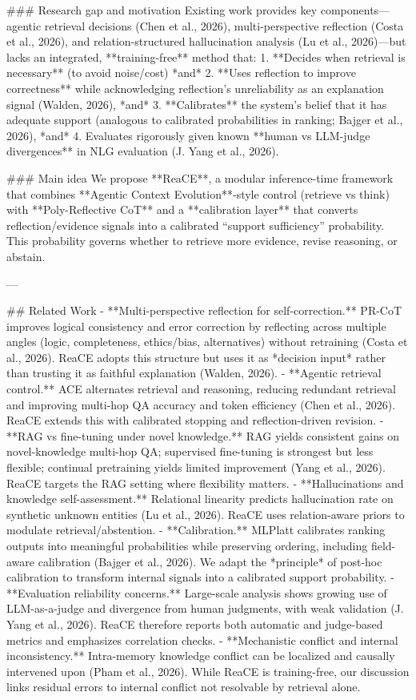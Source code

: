 ### Research gap and motivation  
Existing work provides key components—agentic retrieval decisions (Chen et al., 2026), multi-perspective reflection (Costa et al., 2026), and relation-structured hallucination analysis (Lu et al., 2026)—but lacks an integrated, **training-free** method that:
1. **Decides when retrieval is necessary** (to avoid noise/cost) *and*  
2. **Uses reflection to improve correctness** while acknowledging reflection’s unreliability as an explanation signal (Walden, 2026), *and*  
3. **Calibrates** the system’s belief that it has adequate support (analogous to calibrated probabilities in ranking; Bajger et al., 2026), *and*  
4. Evaluates rigorously given known **human vs LLM-judge divergences** in NLG evaluation (J. Yang et al., 2026).

### Main idea  
We propose **ReaCE**, a modular inference-time framework that combines **Agentic Context Evolution**-style control (retrieve vs think) with **Poly-Reflective CoT** and a **calibration layer** that converts reflection/evidence signals into a calibrated “support sufficiency” probability. This probability governs whether to retrieve more evidence, revise reasoning, or abstain.

---

## Related Work  
- **Multi-perspective reflection for self-correction.** PR-CoT improves logical consistency and error correction by reflecting across multiple angles (logic, completeness, ethics/bias, alternatives) without retraining (Costa et al., 2026). ReaCE adopts this structure but uses it as *decision input* rather than trusting it as faithful explanation (Walden, 2026).  
- **Agentic retrieval control.** ACE alternates retrieval and reasoning, reducing redundant retrieval and improving multi-hop QA accuracy and token efficiency (Chen et al., 2026). ReaCE extends this with calibrated stopping and reflection-driven revision.  
- **RAG vs fine-tuning under novel knowledge.** RAG yields consistent gains on novel-knowledge multi-hop QA; supervised fine-tuning is strongest but less flexible; continual pretraining yields limited improvement (Yang et al., 2026). ReaCE targets the RAG setting where flexibility matters.  
- **Hallucinations and knowledge self-assessment.** Relational linearity predicts hallucination rate on synthetic unknown entities (Lu et al., 2026). ReaCE uses relation-aware priors to modulate retrieval/abstention.  
- **Calibration.** MLPlatt calibrates ranking outputs into meaningful probabilities while preserving ordering, including field-aware calibration (Bajger et al., 2026). We adapt the *principle* of post-hoc calibration to transform internal signals into a calibrated support probability.  
- **Evaluation reliability concerns.** Large-scale analysis shows growing use of LLM-as-a-judge and divergence from human judgments, with weak validation (J. Yang et al., 2026). ReaCE therefore reports both automatic and judge-based metrics and emphasizes correlation checks.  
- **Mechanistic conflict and internal inconsistency.** Intra-memory knowledge conflict can be localized and causally intervened upon (Pham et al., 2026). While ReaCE is training-free, our discussion links residual errors to internal conflict not resolvable by retrieval alone.

